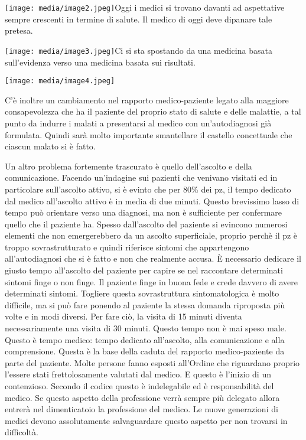 \documentclass[]{article}
\begin{document}
\texttt{[image: media/image2.jpeg]}Oggi
i medici si trovano davanti ad aspettative sempre crescenti in termine
di salute. Il medico di oggi deve dipanare tale pretesa.

\texttt{[image: media/image3.jpeg]}Ci
si sta spostando da una medicina basata sull'evidenza verso una medicina
basata sui risultati.

\texttt{[image: media/image4.jpeg]}

C'è inoltre un cambiamento nel rapporto medico-paziente legato alla
maggiore consapevolezza che ha il paziente del proprio stato di salute e
delle malattie, a tal punto da indurre i malati a presentarsi al medico
con un'autodiagnosi già formulata. Quindi sarà molto importante
smantellare il castello concettuale che ciascun malato si è fatto.

Un altro problema fortemente trascurato è quello dell'ascolto e della
comunicazione. Facendo un'indagine sui pazienti che venivano visitati ed
in particolare sull'ascolto attivo, si è evinto che per 80\% dei pz, il
tempo dedicato dal medico all'ascolto attivo è in media di due minuti.
Questo brevissimo lasso di tempo può orientare verso una diagnosi, ma
non è sufficiente per confermare quello che il paziente ha. Spesso
dall'ascolto del paziente si evincono numerosi elementi che non
emergerebbero da un ascolto superficiale, proprio perchè il pz è troppo
sovrastrutturato e quindi riferisce sintomi che appartengono
all'autodiagnosi che si è fatto e non che realmente accusa. È necessario
dedicare il giusto tempo all'ascolto del paziente per capire se nel
raccontare determinati sintomi finge o non finge. Il paziente finge in
buona fede e crede davvero di avere determinati sintomi. Togliere questa
sovrastruttura sintomatologica è molto difficile, ma si può fare ponendo
al paziente la stessa domanda riproposta più volte e in modi diversi.
Per fare ciò, la visita di 15 minuti diventa necessariamente una visita
di 30 minuti. Questo tempo non è mai speso male. Questo è tempo medico:
tempo dedicato all'ascolto, alla comunicazione e alla comprensione.
Questa è la base della caduta del rapporto medico-paziente da parte del
paziente. Molte persone fanno esposti all'Ordine che riguardano proprio
l'essere stati frettolosamente valutati dal medico. E questo è l'inizio
di un contenzioso. Secondo il codice questo è indelegabile ed è
responsabilità del medico. Se questo aspetto della professione verrà
sempre più delegato allora entrerà nel dimenticatoio la professione del
medico. Le nuove generazioni di medici devono assolutamente
salvaguardare questo aspetto per non trovarsi in difficoltà.
\end{document}
